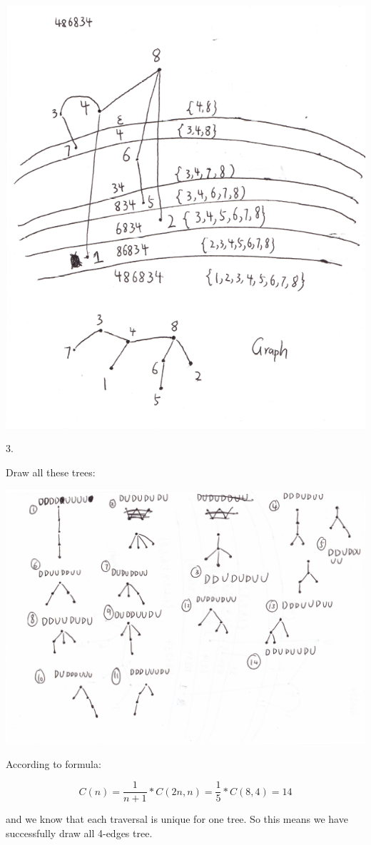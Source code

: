 \documentclass{article}
\begin{document}
\includegraphics[scale=.9]{HW9_2.png}

3.

Draw all these trees:

\includegraphics[scale=.5]{HW9_3.jpg}

According to formula:

$$C(n) = \frac{1}{n+1}*C(2n,n)= \frac{1}{5}*C(8,4) = 14$$

and we know that each traversal is unique for one tree. So this means we have successfully draw all 4-edges tree.
\end{document}

